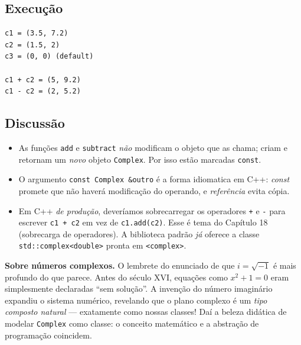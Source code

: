 \documentclass[11pt,a4paper]{article}
\begin{document}


\subsection*{Execu\c{c}\~ao}

\begin{saidabox}
\begin{lstlisting}[style=terminal]
c1 = (3.5, 7.2)
c2 = (1.5, 2)
c3 = (0, 0) (default)

c1 + c2 = (5, 9.2)
c1 - c2 = (2, 5.2)
\end{lstlisting}
\end{saidabox}

\subsection*{Discuss\~ao}

\begin{itemize}[leftmargin=*]
  \item As fun\c{c}\~oes \texttt{add} e \texttt{subtract} \emph{n\~ao} modificam o objeto que as chama; criam e retornam um \emph{novo} objeto \texttt{Complex}. Por isso est\~ao marcadas \texttt{const}.
  \item O argumento \texttt{const Complex \&outro} \'e a forma idiomatica em C++: \emph{const} promete que n\~ao haver\'a modifica\c{c}\~ao do operando, e \emph{refer\^encia} evita c\'opia.
  \item Em C++ \emph{de produ\c{c}\~ao}, dever\'iamos sobrecarregar os operadores \texttt{+} e \texttt{-} para escrever \texttt{c1 + c2} em vez de \texttt{c1.add(c2)}. Esse \'e tema do Cap\'itulo 18 (sobrecarga de operadores). A biblioteca padr\~ao \emph{j\'a} oferece a classe \texttt{std::complex<double>} pronta em \texttt{<complex>}.
\end{itemize}

\begin{obseng}
\textbf{Sobre n\'umeros complexos.} O lembrete do enunciado de que $i = \sqrt{-1}$ \'e mais profundo do que parece. Antes do s\'eculo XVI, equa\c{c}\~oes como $x^2 + 1 = 0$ eram simplesmente declaradas ``sem solu\c{c}\~ao''. A inven\c{c}\~ao do n\'umero imagin\'ario expandiu o sistema num\'erico, revelando que o plano complexo \'e um \emph{tipo composto natural} --- exatamente como nossas classes! Da\'i a beleza did\'atica de modelar \texttt{Complex} como classe: o conceito matem\'atico e a abstra\c{c}\~ao de programa\c{c}\~ao coincidem.
\end{obseng}
\end{document}

